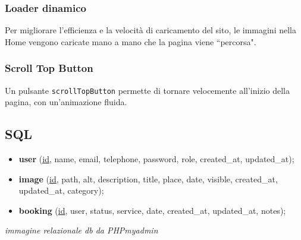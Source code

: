 \subsubsection{Loader dinamico}
Per migliorare l'efficienza e la velocit\`a di caricamento del sito, le immagini nella Home vengono caricate mano a mano che la pagina viene ``percorsa".
\subsubsection{Scroll Top Button}
Un pulsante \texttt{scrollTopButton} permette di tornare velocemente all'inizio della pagina, con un'animazione fluida.

\subsection{SQL}
\begin{itemize}
    \item \textbf{user} (\underline{id}, name, email, telephone, password, role, created\_at, updated\_at);
    \item \textbf{image} (\underline{id}, path, alt, description, title, place, date, visible, created\_at, updated\_at, category);
    \item \textbf{booking} (\underline{id}, user, status, service, date, created\_at, updated\_at, notes);
\end{itemize}
\vspace{3cm}
\textit{immagine relazionale db da PHPmyadmin}




